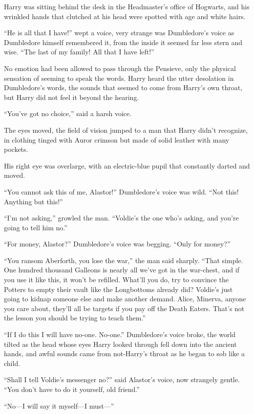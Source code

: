 \begin{em}
Harry was sitting behind the desk in the Headmaster’s office of Hogwarts, and his wrinkled hands that clutched at his head were spotted with age and white hairs.

“He is all that I have!” wept a voice, very strange was Dumbledore’s voice as Dumbledore himself remembered it, from the inside it seemed far less stern and wise. “The last of my family! All that I have left!”

No emotion had been allowed to pass through the Pensieve, only the physical sensation of seeming to speak the words. Harry heard the utter desolation in Dumbledore’s words, the sounds that seemed to come from Harry’s own throat, but Harry did not feel it beyond the hearing.

“You’ve got no choice,” said a harsh voice.

The eyes moved, the field of vision jumped to a man that Harry didn’t recognize, in clothing tinged with Auror crimson but made of solid leather with many pockets.

His right eye was overlarge, with an electric-blue pupil that constantly darted and moved.

“You cannot ask this of me, Alastor!” Dumbledore’s voice was wild. “Not this! Anything but this!”

“I’m not asking,” growled the man. “Voldie’s the one who’s asking, and you’re going to tell him no.”

“For money, Alastor?” Dumbledore’s voice was begging. “Only for money?”

“You ransom Aberforth, you lose the war,” the man said sharply. “That simple. One hundred thousand Galleons is nearly all we’ve got in the war-chest, and if you use it like this, it won’t be refilled. What’ll you do, try to convince the Potters to empty their vault like the Longbottoms already did? Voldie’s just going to kidnap someone else and make another demand. Alice, Minerva, anyone you care about, they’ll all be targets if you pay off the Death Eaters. That’s not the lesson you should be trying to teach them.”

“If I do this I will have no-one. No-one.” Dumbledore’s voice broke, the world tilted as the head whose eyes Harry looked through fell down into the ancient hands, and awful sounds came from not-Harry’s throat as he began to sob like a child.

“Shall I tell Voldie’s messenger no?” said Alastor’s voice, now strangely gentle. “You don’t have to do it yourself, old friend.”

“No—I will say it myself—I must—”
\end{em}


